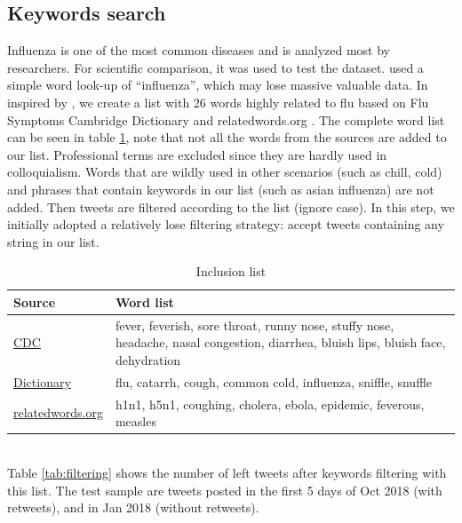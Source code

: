 \subsection{Keywords search}
\label{sec:Keywords search}
Influenza is one of the most common diseases and is analyzed most by researchers. For scientific comparison, it was used to test the dataset. \cite{aramaki2011twitter} used a simple word look-up of ``influenza'', which may lose massive valuable data. In inspired by \cite{lamb2013separating,lampos2010flu}, we create a list with 26 words highly related to flu based on Flu Symptoms \cite{cdc.symp} Cambridge Dictionary \cite{cambridge} and relatedwords.org \cite{relatedwords.org}. The complete word list can be seen in table \ref{tab:words list}, note that not all the words from the sources are added to our list. Professional terms are excluded since they are hardly used in colloquialism. Words that are wildly used in other scenarios (such as chill, cold) and phrases that contain keywords in our list (such as asian influenza) are not added. Then tweets are filtered according to the list (ignore case). In this step, we initially adopted a relatively lose filtering strategy: accept tweets containing any string in our list. 
\begin{table}[!htbp]
    \centering
    \hspace{0.5cm}
    \begin{tabular}{p{90pt}p{320pt}}
        Source & Word list \\ \hline
        \href{https://www.cdc.gov/flu/symptoms/symptoms.htm}{CDC} &  fever, feverish, sore throat, runny nose, stuffy nose, headache, nasal congestion, diarrhea, bluish lips, bluish face, dehydration\\ \hline
        \href{https://dictionary.cambridge.org/us/topics/disease-and-illness/colds-and-flu/}{Dictionary} & flu, catarrh, cough, common cold, influenza, sniffle, snuffle\\ \hline
        \href{https://relatedwords.org/relatedto/flu}{relatedwords.org} & h1n1, h5n1, coughing, cholera, ebola, epidemic, feverous, measles \\ \hline
    \end{tabular}
    \caption{Inclusion list}
    \label{tab:words list}
\end{table}
\\
Table \ref{tab:filtering} shows the number of left tweets after keywords filtering with this list. The test sample are tweets posted in the first 5 days of Oct 2018 (with retweets), and in Jan 2018 (without retweets). 
